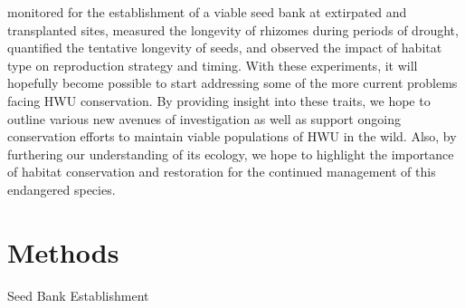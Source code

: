 \documentclass[multicol]{elsarticle}
\begin{document}
\begin{multicols}{2}
monitored for the establishment of a viable seed bank at extirpated and transplanted sites, measured the longevity of rhizomes during periods of drought, quantified the tentative longevity of seeds, and observed the impact of habitat type on reproduction strategy and timing. With these experiments, it will hopefully become possible to start addressing some of the more current problems facing HWU conservation. By providing insight into these traits, we hope to outline various new avenues of investigation as well as support ongoing conservation efforts to maintain viable populations of HWU in the wild. Also, by furthering our understanding of its ecology, we hope to highlight the importance of habitat conservation and restoration for the continued management of this endangered species.

\section{Methods}
\begin{subsection}{Seed Bank Establishment}
\,

\end{subsection}
\end{multicols}
\end{document}
